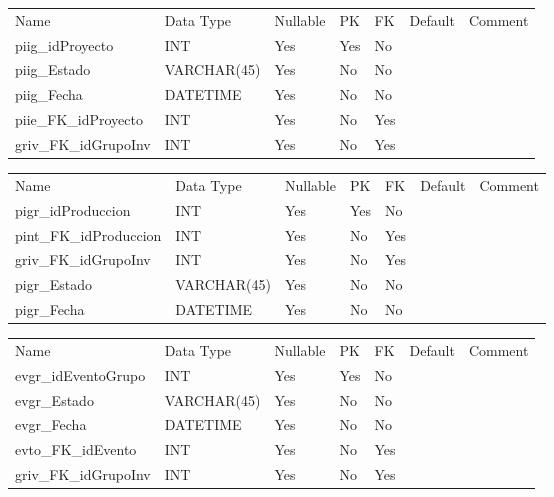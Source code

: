 			\begin{center}
				\begin{tabular}{ |l|l|l|l|l|l|l| }
					\hline
					Name & Data Type & Nullable & PK & FK & Default & Comment \\
					piig_idProyecto & INT & Yes & Yes & No &  & \\ \hline 
piig_Estado & VARCHAR(45) & Yes & No & No &  & \\ \hline 
piig_Fecha & DATETIME & Yes & No & No &  & \\ \hline 
piie_FK_idProyecto & INT & Yes & No & Yes &  & \\ \hline 
griv_FK_idGrupoInv & INT & Yes & No & Yes &  & \\ \hline 

				\end{tabular}
			\end{center}
		

			\begin{center}
				\begin{tabular}{ |l|l|l|l|l|l|l| }
					\hline
					Name & Data Type & Nullable & PK & FK & Default & Comment \\
					pigr_idProduccion & INT & Yes & Yes & No &  & \\ \hline 
pint_FK_idProduccion & INT & Yes & No & Yes &  & \\ \hline 
griv_FK_idGrupoInv & INT & Yes & No & Yes &  & \\ \hline 
pigr_Estado & VARCHAR(45) & Yes & No & No &  & \\ \hline 
pigr_Fecha & DATETIME & Yes & No & No &  & \\ \hline 

				\end{tabular}
			\end{center}
		

			\begin{center}
				\begin{tabular}{ |l|l|l|l|l|l|l| }
					\hline
					Name & Data Type & Nullable & PK & FK & Default & Comment \\
					evgr_idEventoGrupo & INT & Yes & Yes & No &  & \\ \hline 
evgr_Estado & VARCHAR(45) & Yes & No & No &  & \\ \hline 
evgr_Fecha & DATETIME & Yes & No & No &  & \\ \hline 
evto_FK_idEvento & INT & Yes & No & Yes &  & \\ \hline 
griv_FK_idGrupoInv & INT & Yes & No & Yes &  & \\ \hline 

				\end{tabular}
			\end{center}
		

